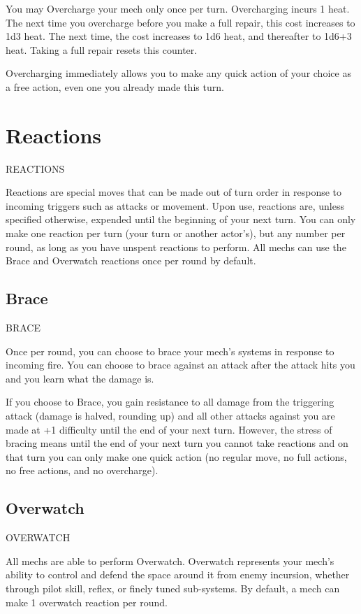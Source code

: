 You may Overcharge your mech only once per turn. Overcharging incurs 1 heat. The next time
you overcharge before you make a full repair, this cost increases to 1d3 heat. The next time, the
cost increases to 1d6 heat, and thereafter to 1d6+3 heat. Taking a full repair resets this counter.


Overcharging immediately allows you to make any quick action of your choice as a free
action, even one you already made this turn.

\section{Reactions}
                                        REACTIONS

Reactions are special moves that can be made out of turn order in response to incoming triggers
such as attacks or movement. Upon use, reactions are, unless specified otherwise, expended
until the beginning of your next turn. You can only make one reaction per turn (your turn or
another actor’s), but any number per round, as long as you have unspent reactions to perform.
All mechs can use the Brace and Overwatch reactions once per round by default.

\subsection{Brace}
                                                  BRACE

Once per round, you can choose to brace your mech’s systems in response to incoming fire. You
can choose to brace against an attack after the attack hits you and you learn what the damage
is.


If you choose to Brace, you gain resistance to all damage from the triggering attack (damage is
halved, rounding up) and all other attacks against you are made at +1 difficulty until the end of
your next turn. However, the stress of bracing means until the end of your next turn you cannot
take reactions and on that turn you can only make one quick action (no regular move, no full
actions, no free actions, and no overcharge).
 \subsection{Overwatch}

                                              OVERWATCH

All mechs are able to perform Overwatch. Overwatch represents your mech’s ability to control
and defend the space around it from enemy incursion, whether through pilot skill, reflex, or finely
tuned sub-systems. By default, a mech can make 1 overwatch reaction per round.


